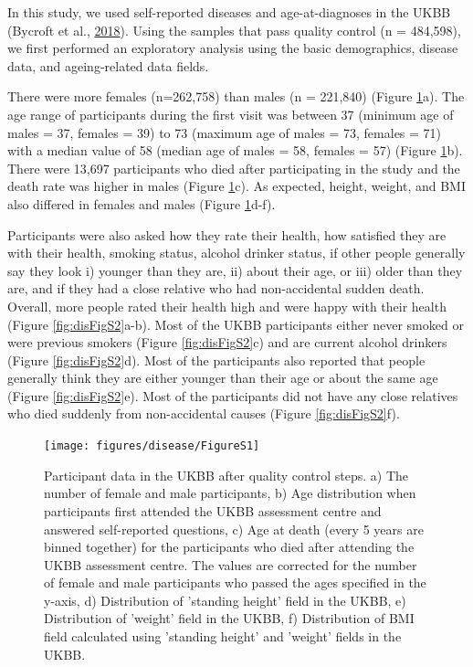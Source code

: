 \documentclass[12pt,twoside]{unicam}
\begin{document}
In this study, we used self-reported diseases and age-at-diagnoses in the UKBB (Bycroft et al., \protect\hyperlink{ref-Bycroft2018}{2018}). Using the samples that pass quality control (n = 484,598), we first performed an exploratory analysis using the basic demographics, disease data, and ageing-related data fields.

There were more females (n=262,758) than males (n = 221,840) (Figure \ref{fig:disFigS1}a). The age range of participants during the first visit was between 37 (minimum age of males = 37, females = 39) to 73 (maximum age of males = 73, females = 71) with a median value of 58 (median age of males = 58, females = 57) (Figure \ref{fig:disFigS1}b). There were 13,697 participants who died after participating in the study and the death rate was higher in males (Figure \ref{fig:disFigS1}c). As expected, height, weight, and BMI also differed in females and males (Figure \ref{fig:disFigS1}d-f).

Participants were also asked how they rate their health, how satisfied they are with their health, smoking status, alcohol drinker status, if other people generally say they look i) younger than they are, ii) about their age, or iii) older than they are, and if they had a close relative who had non-accidental sudden death. Overall, more people rated their health high and were happy with their health (Figure \ref{fig:disFigS2}a-b). Most of the UKBB participants either never smoked or were previous smokers (Figure \ref{fig:disFigS2}c) and are current alcohol drinkers (Figure \ref{fig:disFigS2}d). Most of the participants also reported that people generally think they are either younger than their age or about the same age (Figure \ref{fig:disFigS2}e). Most of the participants did not have any close relatives who died suddenly from non-accidental causes (Figure \ref{fig:disFigS2}f).

\begin{figure}

{\centering \texttt{[image: figures/disease/FigureS1]} 

}

\caption[Participant data in the UKBB after quality control steps.]{Participant data in the UKBB after quality control steps. a) The number of female and male participants, b) Age distribution when participants first attended the UKBB assessment centre and answered self-reported questions, c) Age at death (every 5 years are binned together) for the participants who died after attending the UKBB assessment centre. The values are corrected for the number of female and male participants who passed the ages specified in the y-axis, d) Distribution of 'standing height' field in the UKBB, e) Distribution of 'weight' field in the UKBB, f) Distribution of BMI field calculated using 'standing height' and 'weight' fields in the UKBB.}\label{fig:disFigS1}
\end{figure}
\end{document}
